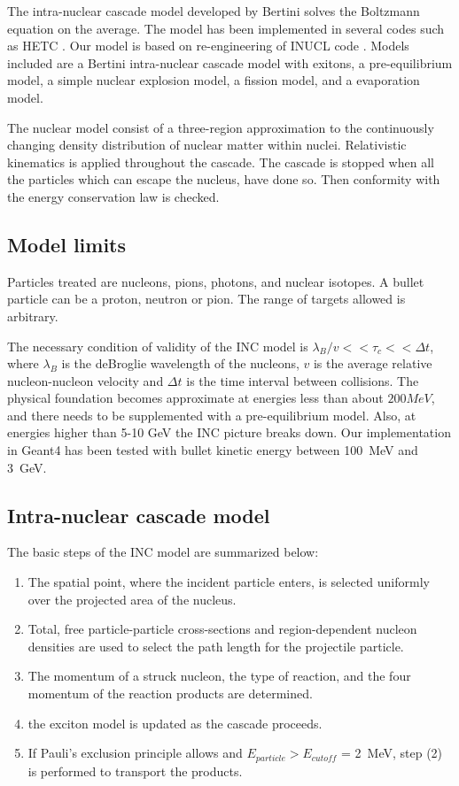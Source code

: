 \documentclass[twocolumn,twoside,slac,floatfix]{revtex4}
\begin{document}
The intra-nuclear cascade model developed by Bertini \cite{bertini68, bertini69, bertini71} solves the Boltzmann equation on the average.
The model has been implemented in several codes such as HETC \cite{alsmiller90}. 
Our model is based on re-engineering of INUCL code \cite{titarenko99a}.
Models included are a Bertini intra-nuclear cascade model with exitons, a pre-equilibrium model, a simple nuclear explosion model, a fission model, and a evaporation model. 

The nuclear model consist of a three-region approximation to the continuously changing density distribution of nuclear matter within nuclei.
Relativistic kinematics is applied throughout the cascade.
The cascade is stopped when all the particles which can escape the nucleus, have done so. 
Then conformity with the energy conservation law is checked.


\subsection{Model limits}

Particles treated are nucleons, pions, photons, and nuclear isotopes.
A bullet particle can be a proton, neutron or pion.
The range of targets allowed is arbitrary.

The necessary condition of validity of the INC model is $\lambda_{B} / v << \tau_{c} << \Delta t$, 
where $\lambda_{B}$ is the deBroglie wavelength of the nucleons, 
$v$ is the average relative nucleon-nucleon velocity and $\Delta t$ is the time interval between collisions.
The physical foundation becomes approximate at energies less than about $200 MeV$, and there needs to be supplemented with a pre-equilibrium model.
Also, at energies higher than 5-10 GeV the INC picture breaks down.
Our implementation in Geant4 has been tested with bullet kinetic energy between 100~MeV and 3~GeV.

\subsection{Intra-nuclear cascade model}

The basic steps of the INC model are summarized below:

\begin{enumerate}
\item The spatial point, where the incident particle enters, is selected uniformly over the projected area of the nucleus.
\item Total, free particle-particle cross-sections and region-dependent nucleon densities are used to select the path length for the projectile particle.
\item The momentum of a struck nucleon, the type of reaction, and the four momentum of the reaction products are determined.
\item the exciton model is updated as the cascade proceeds.
\item If Pauli's exclusion principle allows and $E_{particle} > E_{cutoff}$ = 2~MeV, step (2) is performed to transport the products.
\end{enumerate}
\end{document}
